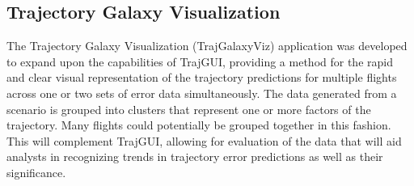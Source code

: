 \documentclass[]{article}
\begin{document}

\subsection{Trajectory Galaxy Visualization}
\label{trajGalaxyVis2d}
The Trajectory Galaxy Visualization (TrajGalaxyViz) application was developed to expand upon the capabilities of TrajGUI, providing a method for the rapid and clear visual representation of the trajectory predictions for multiple flights across one or two sets of error data simultaneously. The data generated from a scenario is grouped into clusters that represent one or more factors of the trajectory. Many flights could potentially be grouped together in this fashion. This will complement TrajGUI, allowing for evaluation of the data that will aid analysts in recognizing trends in trajectory error predictions as well as their significance. 
\end{document}
